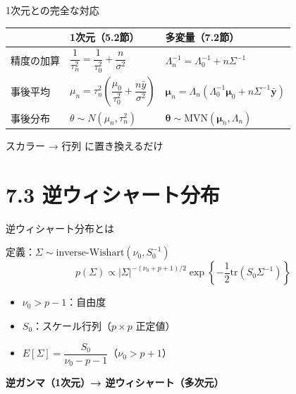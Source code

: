 \documentclass[lualatex,aspectratio=169,12pt]{beamer}
\newcommand{\mvn}{\mathrm{MVN}}
\newcommand{\IW}{\mathrm{inverse\text{-}Wishart}}
\newcommand{\tr}{\mathrm{tr}}
\begin{document}
\begin{frame}{1次元との完全な対応}
  \begin{center}
  \renewcommand{\arraystretch}{1.8}
  \begin{tabular}{lll}
  \toprule
   & 1次元（5.2節） & 多変量（7.2節） \\
  \midrule
  精度の加算 & $\dfrac{1}{\tau_n^2} = \dfrac{1}{\tau_0^2} + \dfrac{n}{\sigma^2}$ &
              $\Lambda_n^{-1} = \Lambda_0^{-1} + n\Sigma^{-1}$ \\[6pt]
  事後平均 & $\mu_n = \tau_n^2\!\left(\dfrac{\mu_0}{\tau_0^2} + \dfrac{n\bar{y}}{\sigma^2}\right)$ &
             $\bm{\mu}_n = \Lambda_n\!\left(\Lambda_0^{-1}\bm{\mu}_0 + n\Sigma^{-1}\bar{\bm{y}}\right)$ \\[6pt]
  事後分布 & $\theta \sim N(\mu_n, \tau_n^2)$ & $\bm{\theta} \sim \mvn(\bm{\mu}_n, \Lambda_n)$ \\
  \bottomrule
  \end{tabular}
  \end{center}

  \vspace{0.5em}
  \centering
  \alert{スカラー → 行列 に置き換えるだけ}
\end{frame}

\section{7.3 逆ウィシャート分布}

\begin{frame}{逆ウィシャート分布とは}
  \begin{block}{定義：$\Sigma \sim \IW(\nu_0, S_0^{-1})$}
    \[
      p(\Sigma) \propto |\Sigma|^{-(\nu_0+p+1)/2}\exp\!\left\{-\frac12\tr(S_0\Sigma^{-1})\right\}
    \]
    \begin{itemize}
      \item $\nu_0 > p-1$：自由度
      \item $S_0$：スケール行列（$p\times p$ 正定値）
      \item $E[\Sigma] = \dfrac{S_0}{\nu_0 - p - 1}$（$\nu_0 > p+1$）
    \end{itemize}
  \end{block}

  \bigskip
  \begin{center}
  \textbf{逆ガンマ（1次元）→ 逆ウィシャート（多次元）}
  \end{center}
\end{frame}
\end{document}
